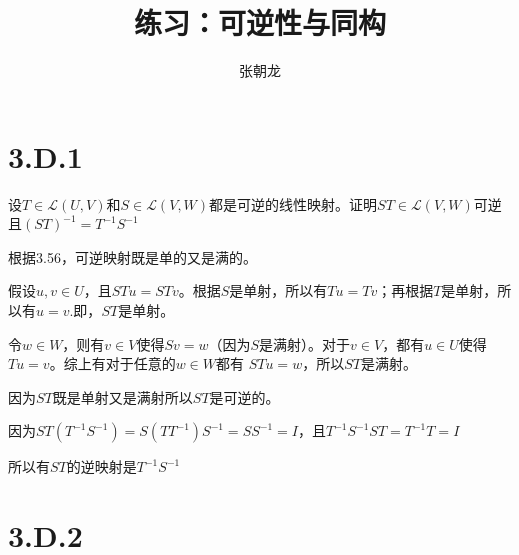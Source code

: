 \documentclass[10pt,a4paper,UTF8]{article}
\author{张朝龙}
\date{}
\title{练习：可逆性与同构}
\begin{document}
\maketitle
\tableofcontents
{}

\section{3.D.1}
\label{sec:org865dae5}


\begin{problem}
设\(T\in \mathcal{L}(U,V)\)和\(S\in \mathcal{L}(V,W)\)都是可逆的线性映射。证明\(ST\in \mathcal{L}(V,W)\)可逆且\((ST)^{-1} = T^{-1}S^{-1}\)
\end{problem}

\begin{answer}
根据3.56，可逆映射既是单的又是满的。

假设\(u,v\in U\)，且\(STu = STv\)。根据\(S\)是单射，所以有\(Tu=Tv\)；再根据\(T\)是单射，所以有\(u=v\).即，\(ST\)是单射。

令\(w\in W\)，则有\(v\in V\)使得\(Sv=w\)（因为\(S\)是满射）。对于\(v\in V\)，都有\(u\in U\)使得\(Tu=v\)。综上有对于任意的\(w\in W\)都有 \(STu = w\)，所以\(ST\)是满射。

因为\(ST\)既是单射又是满射所以\(ST\)是可逆的。


因为\(ST(T^{-1}S^{-1}) = S(TT^{-1})S^{-1} = SS^{-1} = I\)，且\(T^{-1}S^{-1}ST = T^{-1}T = I\)

所以有\(ST\)的逆映射是\(T^{-1}S^{-1}\)
\end{answer}

\section{3.D.2}
\label{sec:orgc490f0d}
\end{document}
